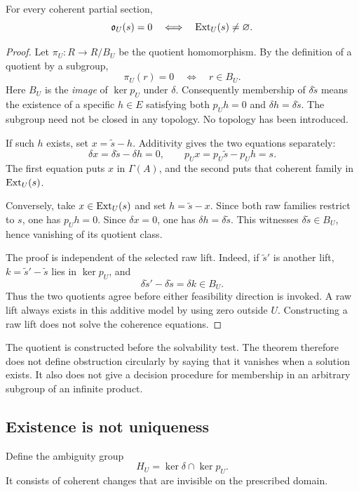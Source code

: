 \begin{theorem}\label{KS09}
For every coherent partial section,
\[
 \mathfrak o_U(s)=0\quad\Longleftrightarrow\quad\operatorname{Ext}_U(s)\ne\varnothing.
\]
\end{theorem}
\begin{proof}
Let $\pi_U:R\to R/B_U$ be the quotient homomorphism. By the definition of a quotient by a subgroup,
\[
 \pi_U(r)=0\quad\Longleftrightarrow\quad r\in B_U.
\]
Here $B_U$ is the \emph{image} of $\ker p_U$ under $\delta$. Consequently membership of $\delta\widetilde s$ means the existence of a specific $h\in E$ satisfying both $p_Uh=0$ and $\delta h=\delta\widetilde s$. The subgroup need not be closed in any topology. No topology has been introduced.

If such $h$ exists, set $x=\widetilde s-h$. Additivity gives the two equations separately:
\[
 \delta x=\delta\widetilde s-\delta h=0,
 \qquad p_Ux=p_U\widetilde s-p_Uh=s.
\]
The first equation puts $x$ in $\Gamma(A)$, and the second puts that coherent family in $\operatorname{Ext}_U(s)$.

Conversely, take $x\in\operatorname{Ext}_U(s)$ and set $h=\widetilde s-x$. Since both raw families restrict to $s$, one has $p_Uh=0$. Since $\delta x=0$, one has $\delta h=\delta\widetilde s$. This witnesses $\delta\widetilde s\in B_U$, hence vanishing of its quotient class.

The proof is independent of the selected raw lift. Indeed, if $\widetilde s'$ is another lift, $k=\widetilde s'-\widetilde s$ lies in $\ker p_U$, and
\[
 \delta\widetilde s'-\delta\widetilde s=\delta k\in B_U.
\]
Thus the two quotients agree before either feasibility direction is invoked. A raw lift always exists in this additive model by using zero outside $U$. Constructing a raw lift does not solve the coherence equations.
\end{proof}
The quotient is constructed before the solvability test. The theorem therefore does not define obstruction circularly by saying that it vanishes when a solution exists. It also does not give a decision procedure for membership in an arbitrary subgroup of an infinite product.


\subsection{Existence is not uniqueness}
Define the ambiguity group
\[
 H_U=\ker\delta\cap\ker p_U.
\]
It consists of coherent changes that are invisible on the prescribed domain.

